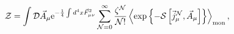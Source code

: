 \begin{equation}
\label{Z4D}
{\cal Z}=\int {\cal D}\vec A_\mu{\rm e}^{-\frac14\int d^4x\vec F_{\mu\nu}^2}\sum\limits_{{\cal N}=0}^{\infty}
\frac{\zeta^{\cal N}}{{\cal N}!}\left<\exp\left\{-{\cal S}\left[\vec j_\mu^{\cal N}, \vec A_\mu\right]\right\}\right>_{\rm mon},
\end{equation}

